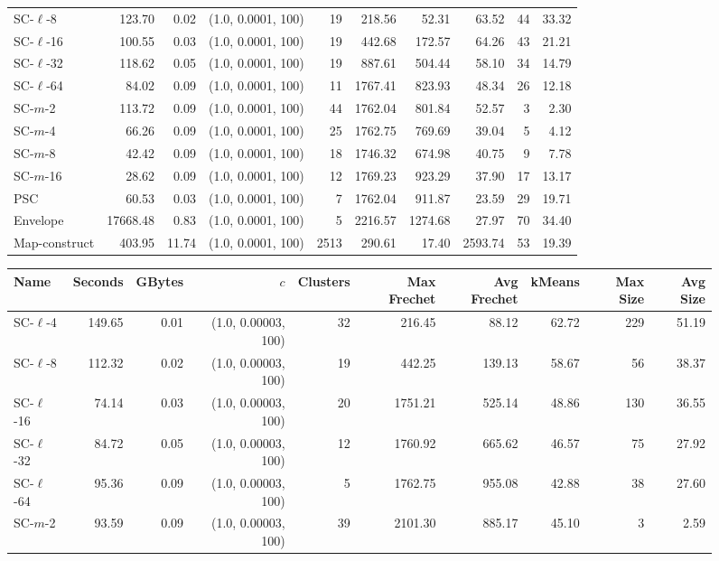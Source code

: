 \documentclass[11pt]{article}
\begin{document}
\begin{figure}
\begin{center}
\begin{minipage}{\textwidth}
{\begin{tabular}{@{}lrrrrrrrrr@{}}
SC-$\ell$-8 & 123.70 & 0.02 & (1.0, 0.0001, 100) & 19 & 218.56 & 52.31 & 63.52 & 44 & 33.32\\
SC-$\ell$-16 & 100.55 & 0.03 & (1.0, 0.0001, 100) & 19 & 442.68 & 172.57 & 64.26 & 43 & 21.21\\
SC-$\ell$-32 & 118.62 & 0.05 & (1.0, 0.0001, 100) & 19 & 887.61 & 504.44 & 58.10 & 34 & 14.79\\
SC-$\ell$-64 & 84.02 & 0.09 & (1.0, 0.0001, 100) & 11 & 1767.41 & 823.93 & 48.34 & 26 & 12.18\\
SC-$m$-2 & 113.72 & 0.09 & (1.0, 0.0001, 100) & 44 & 1762.04 & 801.84 & 52.57 & 3 & 2.30\\
SC-$m$-4 & 66.26 & 0.09 & (1.0, 0.0001, 100) & 25 & 1762.75 & 769.69 & 39.04 & 5 & 4.12\\
SC-$m$-8 & 42.42 & 0.09 & (1.0, 0.0001, 100) & 18 & 1746.32 & 674.98 & 40.75 & 9 & 7.78\\
SC-$m$-16 & 28.62 & 0.09 & (1.0, 0.0001, 100) & 12 & 1769.23 & 923.29 & 37.90 & 17 & 13.17\\
PSC& 60.53 & 0.03 & (1.0, 0.0001, 100) & 7 & 1762.04 & 911.87 & 23.59 & 29 & 19.71\\
Envelope & 17668.48 & 0.83 & (1.0, 0.0001, 100) & 5 & 2216.57 & 1274.68 & 27.97 & 70 & 34.40\\
Map-construct & 403.95 & 11.74 & (1.0, 0.0001, 100) & 2513 & 290.61 & 17.40 & 2593.74 & 53 & 19.39\\
        \bottomrule
    \end{tabular}
    }
    {
    \begin{tabular}{@{}lrrrrrrrrr@{}}
        \toprule
        Name & Seconds & GBytes & $c$ & Clusters & Max Frechet & Avg Frechet & kMeans & Max Size & Avg Size\\
        \midrule
        SC-$\ell$-4 & 149.65 & 0.01 & (1.0, 0.00003, 100) & 32 & 216.45 & 88.12 & 62.72 & 229 & 51.19\\
SC-$\ell$-8 & 112.32 & 0.02 & (1.0, 0.00003, 100) & 19 & 442.25 & 139.13 & 58.67 & 56 & 38.37\\
SC-$\ell$-16 & 74.14 & 0.03 & (1.0, 0.00003, 100) & 20 & 1751.21 & 525.14 & 48.86 & 130 & 36.55\\
SC-$\ell$-32 & 84.72 & 0.05 & (1.0, 0.00003, 100) & 12 & 1760.92 & 665.62 & 46.57 & 75 & 27.92\\
SC-$\ell$-64 & 95.36 & 0.09 & (1.0, 0.00003, 100) & 5 & 1762.75 & 955.08 & 42.88 & 38 & 27.60\\
SC-$m$-2 & 93.59 & 0.09 & (1.0, 0.00003, 100) & 39 & 2101.30 & 885.17 & 45.10 & 3 & 2.59\\

\end{tabular}}
\end{minipage}
\end{center}
\end{figure}
\end{document}
